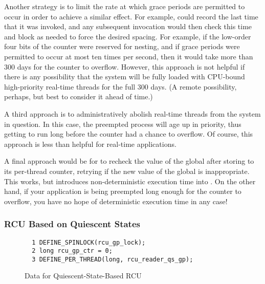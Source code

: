{	Another strategy is to limit the rate at which grace periods are
	permitted to occur in order to achieve a similar effect.
	For example,  could record the last time
	that it was invoked, and any subsequent invocation would then
	check this time and block as needed to force the desired
	spacing.
	For example, if the low-order four bits of the counter were
	reserved for nesting, and if grace periods were permitted to
	occur at most ten times per second, then it would take more
	than 300 days for the counter to overflow.
	However, this approach is not helpful if there is any possibility
	that the system will be fully loaded with CPU-bound high-priority
	real-time threads for the full 300 days.
	(A remote possibility, perhaps, but best to consider it ahead
	of time.)

	A third approach is to administratively abolish real-time threads
	from the system in question.
	In this case, the preempted process will age up in priority,
	thus getting to run long before the counter had a chance to
	overflow.
	Of course, this approach is less than helpful for real-time
	applications.

	A final approach would be for  to recheck
	the value of the global  after storing to its
	per-thread  counter, retrying if the new
	value of the global  is inappropriate.
	This works, but introduces non-deterministic execution time
	into .
	On the other hand, if your application is being preempted long
	enough for the counter to overflow, you have no hope of
	deterministic execution time in any case!

} \QuickQuizEnd

\subsubsection{RCU Based on Quiescent States}
\label{defer:RCU Based on Quiescent States}

\begin{figure}[tbp]
{ \scriptsize
\begin{verbatim}
  1 DEFINE_SPINLOCK(rcu_gp_lock);
  2 long rcu_gp_ctr = 0;
  3 DEFINE_PER_THREAD(long, rcu_reader_qs_gp);
\end{verbatim}
}
\caption{Data for Quiescent-State-Based RCU}
\label{fig:defer:Data for Quiescent-State-Based RCU}
\end{figure}

